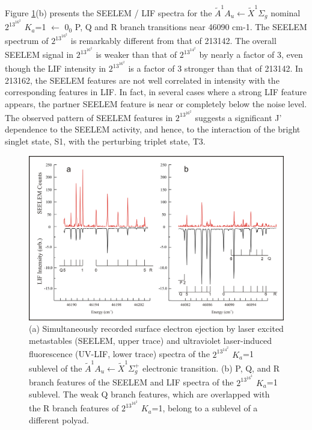 \documentclass[12pt,draft]{mitthesis}
\begin{document}
Figure \ref{fig:spectrum-2131b2}(b) presents the SEELEM / LIF spectra
for the $\tilde{A}^1A_u \leftarrow \tilde{X}^1\Sigma_g$ nominal
$2^13^16^2$ $K_a$=1 $\leftarrow$ $0_0$ P, Q and R branch transitions
near 46090 cm-1. The SEELEM spectrum of $2^13^16^2$ is remarkably different
from that of 213142. The overall SEELEM signal in $2^13^16^2$ is weaker
than that of $2^13^14^2$ by nearly a factor of 3, even though the LIF
intensity in $2^13^16^2$ is a factor of 3 stronger than that of 213142.  In
213162, the SEELEM features are not well correlated in intensity with
the corresponding features in LIF. In fact, in several cases where a
strong LIF feature appears, the partner SEELEM feature is near or
completely below the noise level. The observed pattern of SEELEM
features in $2^13^16^2$ suggests a significant J' dependence to the SEELEM
activity, and hence, to the interaction of the bright singlet state,
S1, with the perturbing triplet state, T3.

\begin{figure}
  \caption{
    (a) Simultaneously recorded surface electron ejection by laser 
    excited metastables (SEELEM, upper trace) and ultraviolet 
    laser-induced fluorescence (UV-LIF, lower trace) spectra of the 
    $2^13^14^2$ $K_a$=1 sublevel of the $\tilde{A}^1A_u \leftarrow
    \tilde{X} ^1\Sigma_g^+$ electronic transition.  (b) P, Q, and R
    branch features of the SEELEM and LIF spectra of the $2^13^16^2$ 
    $K_a$=1 sublevel. The weak Q branch features, which are overlapped 
    with the R branch features of $2^13^16^2$ $K_a$=1, belong to a 
    sublevel of a different polyad.
  }
  \label{fig:spectrum-2131b2}
  \centering
  \includegraphics[width=7.5in,angle=90]{spectrum-2131b2.png}
\end{figure}
\end{document}

